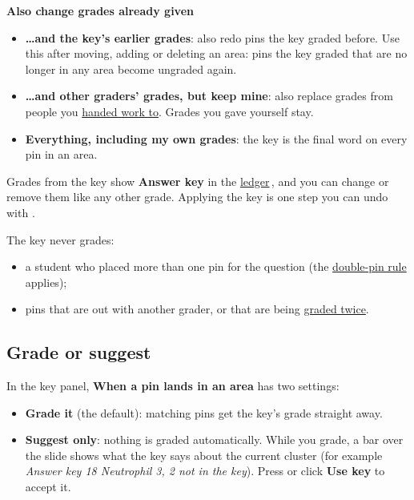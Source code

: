 \textbf{Also change grades already given}

\begin{itemize}[topsep=2pt, itemsep=2pt]
\item \textbf{\ldots{}and the key's earlier grades}: also redo pins the key graded before. Use this after moving, adding or deleting an area: pins the key graded that are no longer in any area become ungraded again.
\item \textbf{\ldots{}and other graders' grades, but keep mine}: also replace grades from people you \hyperref[sec:handoff]{handed work to}. Grades you gave yourself stay.
\item \textbf{Everything, including my own grades}: the key is the final word on every pin in an area.
\end{itemize}

Grades from the key show \textbf{Answer key} in the \href{https://github.com/agadin/micro-speed-grader/blob/main/docs/help/ledger.md}{ledger}\,\onlinemark{}, and you can change or remove them like any other grade. Applying the key is one step you can undo with \keycap{\cmdsym{}}\keyplus{}.

The key never grades:

\begin{itemize}[topsep=2pt, itemsep=2pt]
\item a student who placed more than one pin for the question (the \hyperref[sec:grading:double-pins]{double-pin rule} applies);
\item pins that are out with another grader, or that are being \hyperref[sec:handoff:grade-some-pins-twice]{graded twice}.
\end{itemize}

\tocoff
\subsection{Grade or suggest}\label{sec:answer-key:grade-or-suggest}
\tocon

In the key panel, \textbf{When a pin lands in an area} has two settings:

\begin{itemize}[topsep=2pt, itemsep=2pt]
\item \textbf{Grade it} (the default): matching pins get the key's grade straight away.
\item \textbf{Suggest only}: nothing is graded automatically. While you grade, a bar over the slide shows what the key says about the current cluster (for example \emph{Answer key \checksym{} 18 \crosssym{} Neutrophil 3, 2 not in the key}). Press  or click \textbf{Use key} to accept it.
\end{itemize}

